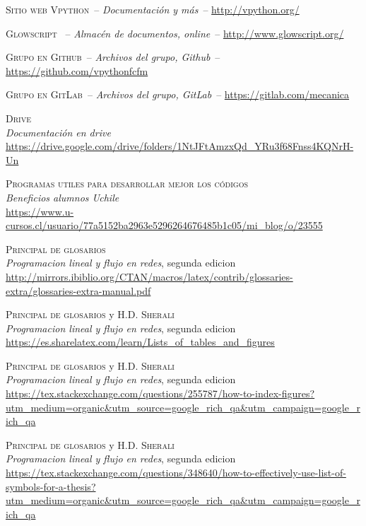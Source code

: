 \documentclass[letterpaper,12pt]{article}
\begin{document}
\newpage
\begin{thebibliography}{X}
	 \textsc{Sitio web Vpython}\ --	\textit{Documentación y más}\ -- 	\url{http://vpython.org/}

	 \textsc{Glowscript} \ --	\textit{Almacén de documentos, online}\ --  	\url{http://www.glowscript.org/}

	 \textsc{Grupo en Github}\ --  	\textit{Archivos del grupo, Github}\ -- 	\url{https://github.com/vpythonfcfm}

	 \textsc{Grupo en GitLab}\ --  	\textit{Archivos del grupo, GitLab}\ -- 	\url{https://gitlab.com/mecanica}

	 \textsc{Drive}\\
	\textit{Documentación en drive}\\
	\url{https://drive.google.com/drive/folders/1NtJFtAmzxQd_YRu3f68Fnss4KQNrH-Un}

	 \textsc{Programas utiles para desarrollar mejor los códigos}\\
	\textit{Beneficios alumnos Uchile}\\
	\url{https://www.u-cursos.cl/usuario/77a5152ba2963e5296264676485b1c05/mi_blog/o/23555}

	 \textsc{Principal de glosarios}\\
	\textit{Programacion lineal y flujo en redes}, segunda edicion\\
	\url{http://mirrors.ibiblio.org/CTAN/macros/latex/contrib/glossaries-extra/glossaries-extra-manual.pdf}

	 \textsc{Principal de glosarios} y \textsc{H.D. Sherali}\\
	\textit{Programacion lineal y flujo en redes}, segunda edicion\\
	\url{https://es.sharelatex.com/learn/Lists_of_tables_and_figures}

	 \textsc{Principal de glosarios} y \textsc{H.D. Sherali}\\
	\textit{Programacion lineal y flujo en redes}, segunda edicion\\
	\url{https://tex.stackexchange.com/questions/255787/how-to-index-figures?utm_medium=organic&utm_source=google_rich_qa&utm_campaign=google_rich_qa}

	 \textsc{Principal de glosarios} y \textsc{H.D. Sherali}\\
	\textit{Programacion lineal y flujo en redes}, segunda edicion\\
	\url{https://tex.stackexchange.com/questions/348640/how-to-effectively-use-list-of-symbols-for-a-thesis?utm_medium=organic&utm_source=google_rich_qa&utm_campaign=google_rich_qa}


\end{thebibliography}
\end{document}
